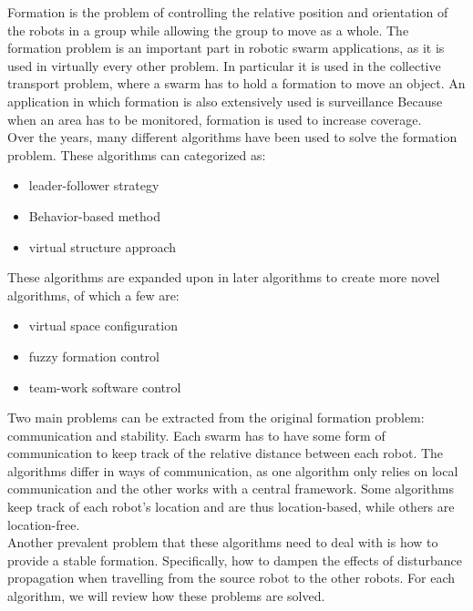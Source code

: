 
Formation is the problem of controlling the relative position and orientation of the robots in a group while allowing the group to move as a whole. \cite{consolini}
The formation problem is an important part in robotic swarm applications, as it is used in virtually every other problem. 
In particular it is used in the collective transport problem, where a swarm has to hold a formation to move an object. 
An application in which formation is also extensively used is surveillance
Because when an area has to be monitored, formation is used to increase coverage. \cite{burkle2011} \\

Over the years, many different algorithms have been used to solve the formation problem. \cite{chen2005} \cite{consolini}
These algorithms can categorized as:

\begin{itemize}
	\item leader-follower strategy \cite{consolini2007} \cite{Das}
	\item Behavior-based method \cite{balch1998} \cite{lawton}
	\item virtual structure approach \cite{ren} \cite{Do}
\end{itemize}

These algorithms are expanded upon in later algorithms to create more novel algorithms, of which a few are:

\begin{itemize}
	\item virtual space configuration \cite{Wee}
	\item fuzzy formation control \cite{Ranjbar-Sahraei}
	\item team-work software control \cite{Kaminka}
\end{itemize}

Two main problems can be extracted from the original formation problem: communication and stability. 
Each swarm has to have some form of communication to keep track of the relative distance between each robot. 
The algorithms differ in ways of communication, as one algorithm only relies on local communication and the other works with a central framework.
Some algorithms keep track of each robot's location and are thus location-based, while others are location-free. \\

Another prevalent problem that these algorithms need to deal with is how to provide a stable formation. 
Specifically, how to dampen the effects of disturbance propagation when travelling from the source robot to the other robots. 
For each algorithm, we will review how these problems are solved. \\


